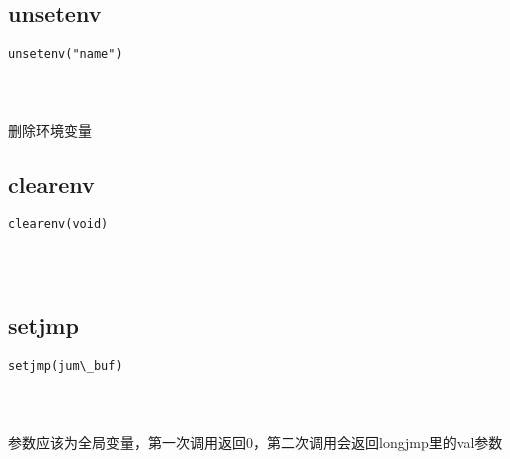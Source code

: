 \documentclass[10pt,a4paper]{article}
\begin{document}
\subsection{unsetenv}
\begin{spacing}{2.0}
\lstset{language=C,numbers=none}
\begin{lstlisting}
unsetenv("name")
\end{lstlisting}
{\large\color[rgb]{0.2,0.4,0.6}{"name":}}
\paragraph{ \ \ }删除环境变量
\end{spacing}

\subsection{clearenv}
\begin{spacing}{2.0}
\lstset{language=C,numbers=none}
\begin{lstlisting}
clearenv(void)
\end{lstlisting}
{\large\color[rgb]{0.2,0.4,0.6}{void:}}
\paragraph{ \ \ }
\end{spacing}

\section{\color[rgb]{0.2,0.4,0.6}{任意跳转}}
\subsection{setjmp}
\begin{spacing}{2.0}
\lstset{language=C,numbers=none}
\begin{lstlisting}
setjmp(jum\_buf)
\end{lstlisting}
{\large\color[rgb]{0.2,0.4,0.6}{jum\_buf:}}
\paragraph{ \ \ }参数应该为全局变量，第一次调用返回0，第二次调用会返回longjmp里的val参数
\end{spacing}
\end{document}
